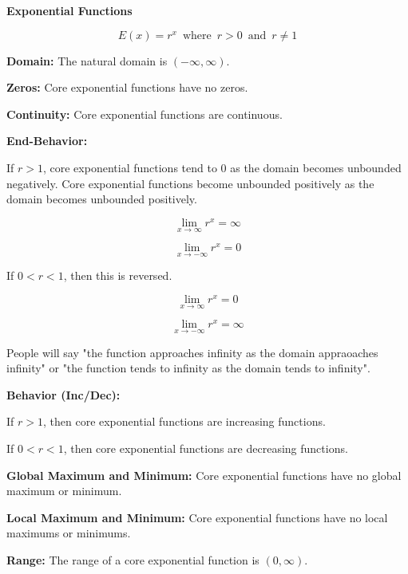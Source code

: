 \documentclass{ximera}
\begin{document}
\begin{explanation} \textbf{\textcolor{red!75!green}{Exponential Functions}} 


\[ E(x) = r^x  \, \text{ where } \, r > 0  \, \text{ and } \, r \ne 1 \]



\textbf{Domain:} The natural domain is $(-\infty, \infty)$.

\textbf{Zeros:} Core exponential functions have no zeros.



\textbf{Continuity:} Core exponential functions are continuous.



\textbf{End-Behavior:} 



If $r > 1$, core exponential functions tend to $0$ as the domain becomes unbounded negatively. Core exponential functions become unbounded positively as the domain becomes unbounded positively.



\[
\lim\limits_{x \to \infty} r^x = \infty
\]


\[
\lim\limits_{x \to -\infty} r^x = 0
\]


If $0 < r < 1$, then this is reversed.



\[
\lim\limits_{x \to \infty} r^x = 0
\]


\[
\lim\limits_{x \to -\infty} r^x = \infty
\]



People will say "the function approaches infinity as the domain appraoaches infinity" or "the function tends to infinity as the domain tends to infinity".


\textbf{Behavior (Inc/Dec):} 


If $r > 1$, then core exponential functions are increasing functions.

If $0 < r < 1$, then core exponential functions are decreasing functions.





\textbf{Global Maximum and Minimum:} Core exponential functions have no global maximum or minimum.

\textbf{Local Maximum and Minimum:}  Core exponential functions have no local maximums or minimums.

\textbf{Range:} The range of a core exponential function is $(0,\infty)$.

\end{explanation}
\end{document}
